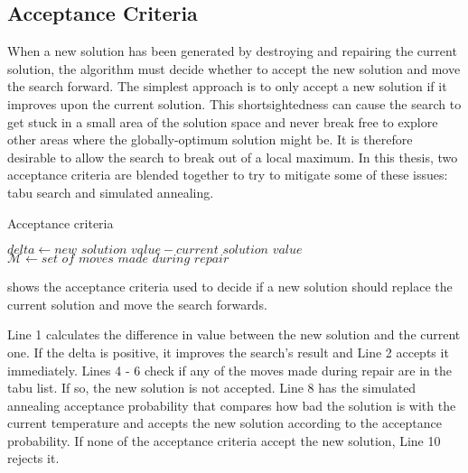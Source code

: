 \subsection{Acceptance Criteria} \label{acceptance}

When a new solution has been generated by destroying and repairing the current solution, the algorithm must decide whether to accept the new solution and move the search forward. The simplest approach is to only accept a new solution if it improves upon the current solution. This shortsightedness can cause the search to get stuck in a small area of the solution space and never break free to explore other areas where the globally-optimum solution might be. It is therefore desirable to allow the search to break out of a local maximum. In this thesis, two acceptance criteria are blended together to try to mitigate some of these issues: tabu search and simulated annealing.

\begin{algorithm}[H]
\caption{Acceptance criteria}\label{acceptance_criteria}
\begin{algorithmic}[1]
    \State $\textit{delta} \gets \textit{new solution value} - \textit{current solution value}$
    \State $\mathcal{M} \gets \textit{set of moves made during repair}$
    
    \EndIf
    
        \EndIf
    \EndFor
    
    \EndIf
    
    \State {}
\end{algorithmic}
\end{algorithm}

 shows the acceptance criteria used to decide if a new solution should replace the current solution and move the search forwards.

Line 1 calculates the difference in value between the new solution and the current one. If the delta is positive, it improves the search's result and Line 2 accepts it immediately.
Lines 4 - 6 check if any of the moves made during repair are in the tabu list. If so, the new solution is not accepted. Line 8 has the simulated annealing acceptance probability that compares how bad the solution is with the current temperature and accepts the new solution according to the acceptance probability. If none of the acceptance criteria accept the new solution, Line 10 rejects it.

